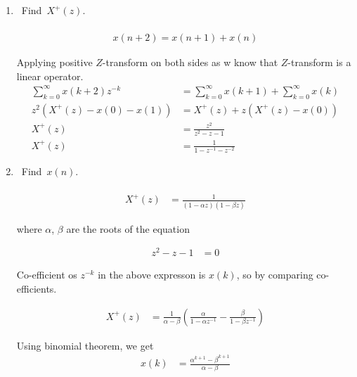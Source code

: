 \documentclass[journal,12pt,twocolumn]{IEEEtran}
\renewcommand\thesection{\arabic{section}}
\begin{document}
\begin{enumerate}[label=\thesection.\arabic*,ref=\thesection.\theenumi]
	\item Find $X^+(z)$.\\
	\solution\\ 
		\begin{align}
			x(n+2) = x(n+1)+x(n)
		\end{align}
		
		Applying positive $Z$-transform on both sides as w know that $Z$-transform is a linear operator.
		\begin{align}
			\sum_{k=0}^\infty x(k+2)z^{-k} & = \sum_{k=0}^{\infty} x(k+1) + \sum_{k=0}^{\infty} x(k)\\
			z^2\left( X^+(z) - x(0) - x(1) \right) & = X^+(z) + z\left(X^+(z) - x(0)\right)\\
			X^+(z) & = \frac{z^2}{z^2 - z - 1}\\
			X^+(z) & = \frac{1}{1-z^{-1}-z^{-2}}
		\end{align}

	\item Find $x(n)$.\\
	\solution\\
		\begin{align}
			X^+(z) & = \frac{1}{\left(1-\alpha z\right)\left(1-\beta z\right)}
		\end{align}
		
		where $\alpha$, $\beta$ are the roots of the equation
		
		\begin{align}
			z^2 - z - 1 & = 0
		\end{align}

		Co-efficient os $z^{-k}$ in the above expresson is $x(k)$, so by comparing co-efficients.

		\begin{align}
			X^+(z) & = \frac{1}{\alpha - \beta} \left(\frac{\alpha}{1-\alpha z^{-1}} - \frac{\beta}{1-\beta z^{-1}}\right)
		\end{align}

		Using binomial theorem, we get
		\begin{align}
			x(k) & = \frac{\alpha^{k+1} - \beta^{k+1}}{\alpha - \beta}
		\end{align}


\end{enumerate}
\end{document}
